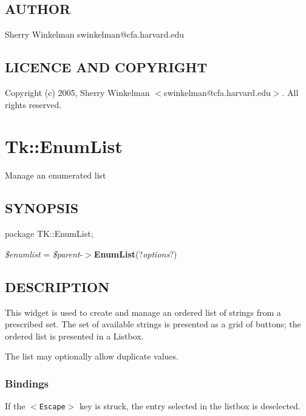 \documentclass{article}
\begin{document}
\subsection*{AUTHOR\label{Too_AUTHOR}}


Sherry Winkelman swinkelman@cfa.harvard.edu

\subsection*{LICENCE AND COPYRIGHT\label{Too_LICENCE_AND_COPYRIGHT}}


Copyright (c) 2005, Sherry Winkelman $<$swinkelman@cfa.harvard.edu$>$. All rights 
reserved.

\clearpage
\section{Tk::EnumList\label{Tk::EnumList}}


Manage an enumerated list

\subsection*{SYNOPSIS\label{Tk::EnumList_SYNOPSIS}}


package TK::EnumList;



\textit{\$enumlist} = \textit{\$parent}-$>$\textbf{EnumList}(?\textit{options}?)

\subsection*{DESCRIPTION\label{Tk::EnumList_DESCRIPTION}}


This widget is used to create and manage an ordered list of strings
from a prescribed set.  The set of available strings is presented as a
grid of buttons; the ordered list is presented in a Listbox.



The list may optionally allow duplicate values.

\subsubsection*{Bindings\label{Tk::EnumList_Bindings}}


If the \texttt{$<$Escape$>$} key is struck, the entry selected in the
listbox is deselected.
\end{document}
